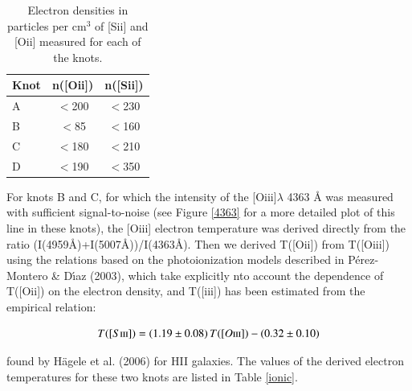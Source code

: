 \documentclass[structabstract]{aa}
\begin{document}

\begin{table}
\centering
\caption[]{Electron densities in particles per cm$^3$ of [S{\sc ii}] and [O{\sc ii}] measured for each of the knots.}
\label{tab_dens}
\begin{tabular} {l c c}
\hline
 Knot & n([O{\sc ii}])  & n([S{\sc ii}]) \\
 \hline
A & $<$200 & $<$230 \\
B & $<$85 & $<$160 \\
C & $<$180 & $<$210 \\
D & $<$190 & $<$350 \\
\hline
\end{tabular}
\end{table}


For knots B and C, for which the intensity of the [O{\sc iii}]$\lambda$ 4363 {\AA}
was measured with sufficient signal-to-noise (see Figure \ref{4363} for a more detailed plot
of this line in these knots), the [O{\sc iii}] electron temperature was derived directly from the ratio
 (I(4959\AA)+I(5007\AA))/I(4363\AA). Then we derived T([O{\sc ii}]) from T([O{\sc iii}]) using the relations based on the photoionization models described in P\'erez-Montero \& D\'\i az (2003), which take explicitly nto account 
the dependence of T([O{\sc ii}]) on the electron density, and T([{\sc iii}]) has been estimated from the empirical relation:

\[T([S\textrm{\sc iii}]) = (1.19 \pm 0.08)\,T([O\textrm{\sc iii}]) - (0.32 \pm 0.10)\]

\noindent found by H\"agele et al. (2006) for HII galaxies.  The values of the derived electron 
temperatures for these two knots are listed in Table \ref{ionic}.
\end{document}
